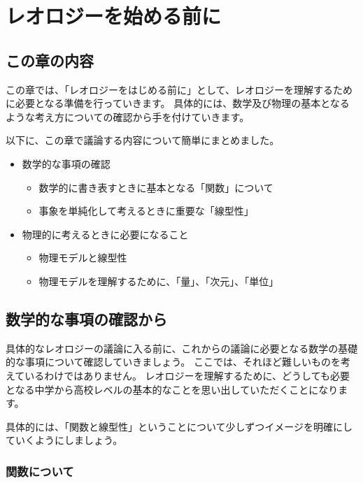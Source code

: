 \documentclass[uplatex,dvipdfmx,a4paper,11pt]{jsreport}
\begin{document}
\setcounter{chapter}{1}
\chapter{レオロジーを始める前に}

\section*{この章の内容}

この章では、「レオロジーをはじめる前に」として、レオロジーを理解するために必要となる準備を行っていきます。
具体的には、数学及び物理の基本となるような考え方についての確認から手を付けていきます。

以下に、この章で議論する内容について簡単にまとめました。

	\begin{boxnote}
		\large
		\begin{itemize}
			\item 数学的な事項の確認
			\begin{itemize}
				\item 数学的に書き表すときに基本となる「関数」について
				\item 事象を単純化して考えるときに重要な「線型性」
			\end{itemize}
			\item 物理的に考えるときに必要になること
			\begin{itemize}
				\item 物理モデルと線型性
				\item 物理モデルを理解するために、「量」、「次元」、「単位」
			\end{itemize}
		\end{itemize}
	\end{boxnote}

\section{数学的な事項の確認から}

具体的なレオロジーの議論に入る前に、これからの議論に必要となる数学の基礎的な事項について確認していきましょう。
ここでは、それほど難しいものを考えているわけではありません。
レオロジーを理解するために、どうしても必要となる中学から高校レベルの基本的なことを思い出していただくことになります。

具体的には、「関数と線型性」ということについて少しずつイメージを明確にしていくようにしましょう。

\subsection{関数について}
\end{document}
